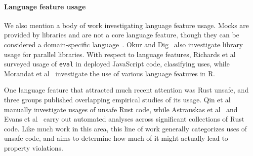 \paragraph{Language feature usage}
We also mention a body of work investigating language feature usage. Mocks are provided by libraries and are not a core language feature, though they can be considered a domain-specific language~\cite{freeman06:_evolv_embed_domain_specif_languag_java}. Okur and Dig~\cite{Okur:2012:DUP:2393596.2393660} also investigate library usage for parallel libraries. With respect to language features, Richards et al~\cite{Richards:2011:EML:2032497.2032503} surveyed usage of \texttt{eval} in deployed JavaScript code, classifying uses, while Morandat et al~\cite{Morandat:2012:EDR:2367163.2367172} investigate the use of various language features in R.

One language feature that attracted much recent attention was Rust unsafe, and three groups published overlapping empirical studies of its usage. Qin et al \cite{qin20:_under_memor_thread_safet_pract} manually investigate usages of unsafe Rust code, while Astrauskas et al~\cite{DBLP:journals/pacmpl/AstrauskasMP0S20} and Evans et al~\cite{DBLP:conf/icse/EvansCS20} carry out automated analyses across significant collections of Rust code. Like much work in this area, this line of work generally categorizes uses of unsafe code, and aims to determine how much of it might actually lead to property violations.



